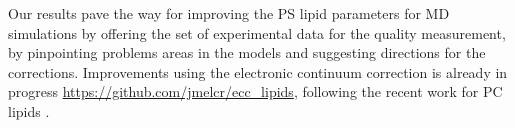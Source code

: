 \documentclass[aps,prl,superscriptaddress,twocolumn]{revtex4}
\begin{document}
Our results pave the way for improving the PS lipid parameters for MD simulations
by offering the set of experimental data for the quality measurement, by
pinpointing problems areas in the models and suggesting directions for the corrections.
Improvements using the electronic continuum correction is already in progress \url{https://github.com/jmelcr/ecc_lipids},
following the recent work for PC lipids \cite{melcr18}.

%

\begin{acknowledgments}
\end{acknowledgments}

\newpage





\listoftodos
\end{document}

